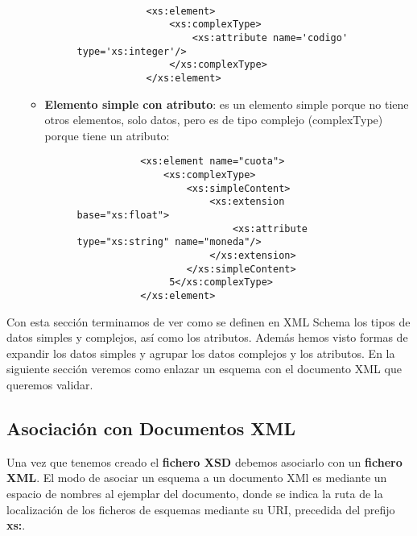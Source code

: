 \begin{itemize}
\begin{itemize}
       \begin{figure}[h]
           \begin{tcolorbox}[sharp corners, colback=yellow!30, colframe=white!20]
               \scriptsize
               \begin{verbatim}

            <xs:element>
                <xs:complexType>
                    <xs:attribute name='codigo' type='xs:integer'/>
                </xs:complexType>
            </xs:element>
               \end{verbatim}
           \end{tcolorbox}
       \end{figure}

   \item \textbf{Elemento simple con atributo}: es un elemento simple porque no tiene otros elementos, solo datos, pero es de tipo complejo (complexType) porque tiene un atributo:

       \begin{figure}[h]
           \begin{tcolorbox}[sharp corners, colback=yellow!30, colframe=white!20]
               \scriptsize
               \begin{verbatim}
           <xs:element name="cuota">
               <xs:complexType>
                   <xs:simpleContent>
                       <xs:extension base="xs:float">
                           <xs:attribute type="xs:string" name="moneda"/>
                       </xs:extension>
                   </xs:simpleContent>
                5</xs:complexType>
           </xs:element>
               \end{verbatim}
           \end{tcolorbox}
       \end{figure}
   \end{itemize}
\end{itemize}

Con esta sección terminamos de ver como se definen en XML Schema los tipos de datos simples y complejos, así como los atributos. Además hemos visto formas de expandir los datos simples y agrupar los datos complejos y los atributos. En la siguiente sección veremos como enlazar un esquema con el documento XML que queremos validar.

\subsection{Asociación con Documentos XML}
Una vez que tenemos creado el \textbf{fichero XSD} debemos asociarlo con un \textbf{fichero XML}. El modo de asociar un esquema a un documento XMl es mediante un espacio de nombres al ejemplar del documento, donde se indica la ruta de la localización de los ficheros de esquemas mediante su URI, precedida del prefijo \textbf{xs:}.

